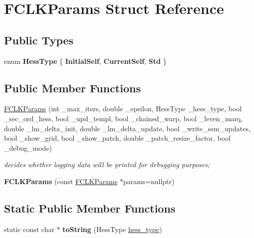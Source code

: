\hypertarget{structFCLKParams}{\section{F\-C\-L\-K\-Params Struct Reference}
\label{structFCLKParams}
}
\subsection*{Public Types}
\begin{DoxyCompactItemize}
\item 
enum {\bfseries Hess\-Type} \{ {\bfseries Initial\-Self}, 
{\bfseries Current\-Self}, 
{\bfseries Std}
 \}
\end{DoxyCompactItemize}
\subsection*{Public Member Functions}
\begin{DoxyCompactItemize}
\item 
\hyperlink{structFCLKParams_acbb5c8042e37cabdee9c38ed1e942f66}{F\-C\-L\-K\-Params} (int \-\_\-max\-\_\-iters, double \-\_\-epsilon, Hess\-Type \-\_\-hess\-\_\-type, bool \-\_\-sec\-\_\-ord\-\_\-hess, bool \-\_\-upd\-\_\-templ, bool \-\_\-chained\-\_\-warp, bool \-\_\-leven\-\_\-marq, double \-\_\-lm\-\_\-delta\-\_\-init, double \-\_\-lm\-\_\-delta\-\_\-update, bool \-\_\-write\-\_\-ssm\-\_\-updates, bool \-\_\-show\-\_\-grid, bool \-\_\-show\-\_\-patch, double \-\_\-patch\-\_\-resize\-\_\-factor, bool \-\_\-debug\-\_\-mode)
\begin{DoxyCompactList}\small\item\em decides whether logging data will be printed for debugging purposes; \end{DoxyCompactList}\item 
\hypertarget{structFCLKParams_a95be51bc8643a43893db2dd5dc0462ab}{{\bfseries F\-C\-L\-K\-Params} (const \hyperlink{structFCLKParams}{F\-C\-L\-K\-Params} $\ast$params=nullptr)}\label{structFCLKParams_a95be51bc8643a43893db2dd5dc0462ab}

\end{DoxyCompactItemize}
\subsection*{Static Public Member Functions}
\begin{DoxyCompactItemize}
\item 
\hypertarget{structFCLKParams_afbdb1a18be20ecb53ea2a5284524c4ba}{static const char $\ast$ {\bfseries to\-String} (Hess\-Type \hyperlink{structFCLKParams_a7ff564478a6a523aaa108524b9700443}{hess\-\_\-type})}\label{structFCLKParams_afbdb1a18be20ecb53ea2a5284524c4ba}

\end{DoxyCompactItemize}
